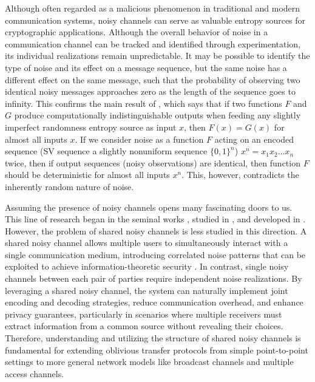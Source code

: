 \documentclass[runningheads]{llncs}
\newcommand{\parbreak}{ \vspace{0.3 em}}
\newcounter{protocol}
\begin{document}
\parbreak Although often regarded as a malicious phenomenon in traditional and modern communication systems, noisy channels can serve as valuable entropy sources for cryptographic applications. Although the overall behavior of noise in a communication channel can be tracked and identified through experimentation, its individual realizations remain unpredictable. It may be possible to identify the type of noise and its effect on a message sequence, but the same noise has a different effect on the same message, such that the probability of observing two identical noisy messages approaches zero as the length of the sequence goes to infinity. This confirms the main result of \cite{Dodis}, which says that if two functions $F$ and $G$ produce computationally indistinguishable outputs when feeding any slightly imperfect randomness entropy source as input $x$, then $F(x) = G(x)$ for almost all inputs $x$. If we consider noise as a function $F$ acting on an encoded sequence (SV sequence a slightly nonuniform sequence $\{0,1\}^n$) $x^n = x_1 x_2 \ldots x_n$ twice, then if output sequences (noisy observations) are identical, then function $F$ should be deterministic for almost all inputs $x^n$. This, however, contradicts the inherently random nature of noise.

\parbreak Assuming the presence of noisy channels opens many fascinating doors to us. This line of research began in the seminal works \cite{Rabin1, Joe}, studied in \cite{Rudolf1, Winter1, Winter3, Crepeau3}, and developed in \cite{Imai, Watanabe2,Watanabe3}. However, the problem of shared noisy channels is less studied in this direction. A shared noisy channel allows multiple users to simultaneously interact with a single communication medium, introducing correlated noise patterns that can be exploited to achieve information-theoretic security \cite{Hadi2,Hadi1}. In contrast, single noisy channels between each pair of parties require independent noise realizations. By leveraging a shared noisy channel, the system can naturally implement joint encoding and decoding strategies, reduce communication overhead, and enhance privacy guarantees, particularly in scenarios where multiple receivers must extract information from a common source without revealing their choices. Therefore, understanding and utilizing the structure of shared noisy channels is fundamental for extending oblivious transfer protocols from simple point-to-point settings to more general network models like broadcast channels and multiple access channels.
\end{document}
